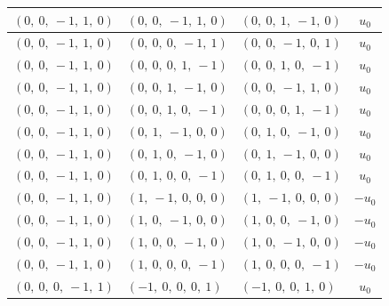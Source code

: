 \documentclass[11pt]{article}
\theoremstyle{definition}
\begin{document}
\begin{longtable}{|l|l|l|c|}
    \hline
    $\left( 0, \  0, \  -1, \  1, \  0\right)$ & $\left( 0, \  0, \  -1, \  1, \  0\right)$ & $\left( 0, \  0, \  1, \  -1, \  0\right)$ & $u_{0}$ \\
    \hline
    $\left( 0, \  0, \  -1, \  1, \  0\right)$ & $\left( 0, \  0, \  0, \  -1, \  1\right)$ & $\left( 0, \  0, \  -1, \  0, \  1\right)$ & $u_{0}$ \\
    \hline
    $\left( 0, \  0, \  -1, \  1, \  0\right)$ & $\left( 0, \  0, \  0, \  1, \  -1\right)$ & $\left( 0, \  0, \  1, \  0, \  -1\right)$ & $u_{0}$ \\
    \hline
    $\left( 0, \  0, \  -1, \  1, \  0\right)$ & $\left( 0, \  0, \  1, \  -1, \  0\right)$ & $\left( 0, \  0, \  -1, \  1, \  0\right)$ & $u_{0}$ \\
    \hline
    $\left( 0, \  0, \  -1, \  1, \  0\right)$ & $\left( 0, \  0, \  1, \  0, \  -1\right)$ & $\left( 0, \  0, \  0, \  1, \  -1\right)$ & $u_{0}$ \\
    \hline
    $\left( 0, \  0, \  -1, \  1, \  0\right)$ & $\left( 0, \  1, \  -1, \  0, \  0\right)$ & $\left( 0, \  1, \  0, \  -1, \  0\right)$ & $u_{0}$ \\
    \hline
    $\left( 0, \  0, \  -1, \  1, \  0\right)$ & $\left( 0, \  1, \  0, \  -1, \  0\right)$ & $\left( 0, \  1, \  -1, \  0, \  0\right)$ & $u_{0}$ \\
    \hline
    $\left( 0, \  0, \  -1, \  1, \  0\right)$ & $\left( 0, \  1, \  0, \  0, \  -1\right)$ & $\left( 0, \  1, \  0, \  0, \  -1\right)$ & $u_{0}$ \\
    \hline
    $\left( 0, \  0, \  -1, \  1, \  0\right)$ & $\left( 1, \  -1, \  0, \  0, \  0\right)$ & $\left( 1, \  -1, \  0, \  0, \  0\right)$ & $- u_{0}$ \\
    \hline
    $\left( 0, \  0, \  -1, \  1, \  0\right)$ & $\left( 1, \  0, \  -1, \  0, \  0\right)$ & $\left( 1, \  0, \  0, \  -1, \  0\right)$ & $- u_{0}$ \\
    \hline
    $\left( 0, \  0, \  -1, \  1, \  0\right)$ & $\left( 1, \  0, \  0, \  -1, \  0\right)$ & $\left( 1, \  0, \  -1, \  0, \  0\right)$ & $- u_{0}$ \\
    \hline
    $\left( 0, \  0, \  -1, \  1, \  0\right)$ & $\left( 1, \  0, \  0, \  0, \  -1\right)$ & $\left( 1, \  0, \  0, \  0, \  -1\right)$ & $- u_{0}$ \\
    \hline
    $\left( 0, \  0, \  0, \  -1, \  1\right)$ & $\left( -1, \  0, \  0, \  0, \  1\right)$ & $\left( -1, \  0, \  0, \  1, \  0\right)$ & $u_{0}$ \\

\end{longtable}
\end{document}
